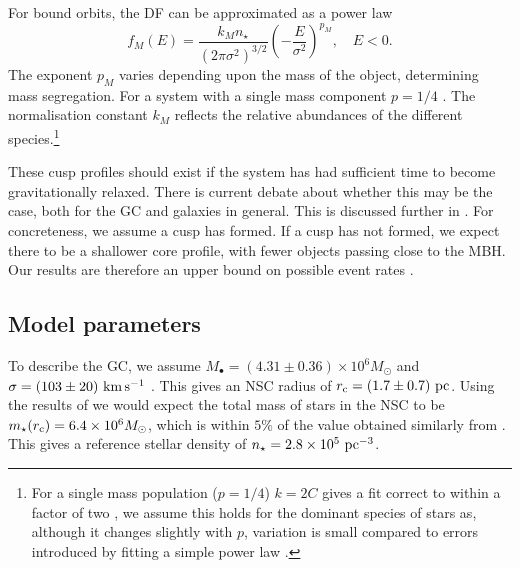 For bound orbits, the DF can be approximated as a power law \citep{Peebles1972}
\begin{equation}
f_M(E) = \dfrac{k_M n_\star}{(2\pi\sigma^2)^{3/2}}\left(-\dfrac{E}{\sigma^2}\right)^{p_M},\quad E < 0.
\label{eq:Bound_DF}
\end{equation}
The exponent $p_M$ varies depending upon the mass of the object, determining mass segregation. For a system with a single mass component $p = 1/4$ \citep{Bahcall1976, Young1977}. The normalisation constant $k_M$ reflects the relative abundances of the different species.\footnote{For a single mass population ($p = 1/4$) $k = 2 C$ gives a fit correct to within a factor of two \citep{Bahcall1976,Keshet2009}, we assume this holds for the dominant species of stars as, although it changes slightly with $p$, variation is small compared to errors introduced by fitting a simple power law \citep{Hopman2006, Alexander2009}.}

These cusp profiles should exist if the system has had sufficient time to become gravitationally relaxed. There is current debate about whether this may be the case, both for the GC and galaxies in general. This is discussed further in . For concreteness, we assume a cusp has formed. If a cusp has not formed, we expect there to be a shallower core profile, with fewer objects passing close to the MBH. Our results are therefore an upper bound on possible event rates \citep{Merritt2010a,Antonini2011,Gualandris2012}. 

\subsection{Model parameters}\label{sec:GC-Param}

To describe the GC, we assume $M_\bullet = (4.31 \pm 0.36) \times 10^6 M_\odot$ \citep{Gillessen2009} and $\sigma = (103 \pm 20)~\mathrm{km\,s^{-1}}$ \citep{Tremaine2002}. This gives an NSC radius of $r_\mathrm{c} = (1.7 \pm 0.7)~\mathrm{pc}$. Using the results of \citet{Ghez2008} we would expect the total mass of stars in the NSC to be $m_\star(r_\mathrm{c}) = 6.4 \times 10^6 M_\odot$, which is within $5\%$ of the value obtained similarly from \citet{Genzel2003}. This gives a reference stellar density of $n_\star = 2.8 \times 10^5~\mathrm{pc^{-3}}$.

